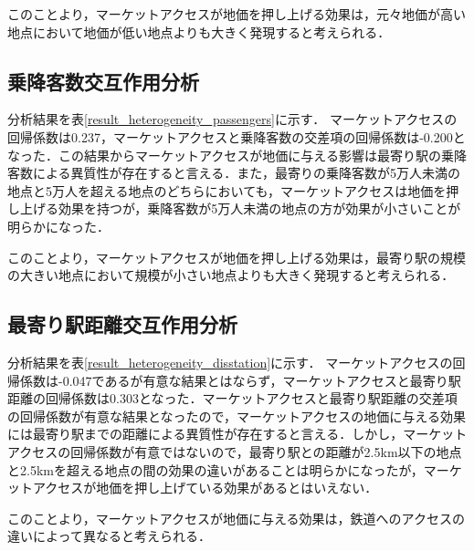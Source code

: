 このことより，マーケットアクセスが地価を押し上げる効果は，元々地価が高い地点において地価が低い地点よりも大きく発現すると考えられる．


\subsection{乗降客数交互作用分析}
分析結果を表\ref{result_heterogeneity_passengers}に示す．
マーケットアクセスの回帰係数は0.237，マーケットアクセスと乗降客数の交差項の回帰係数は-0.200となった．この結果からマーケットアクセスが地価に与える影響は最寄り駅の乗降客数による異質性が存在すると言える．また，最寄りの乗降客数が5万人未満の地点と5万人を超える地点のどちらにおいても，マーケットアクセスは地価を押し上げる効果を持つが，乗降客数が5万人未満の地点の方が効果が小さいことが明らかになった．

このことより，マーケットアクセスが地価を押し上げる効果は，最寄り駅の規模の大きい地点において規模が小さい地点よりも大きく発現すると考えられる．

\subsection{最寄り駅距離交互作用分析}
分析結果を表\ref{result_heterogeneity_disstation}に示す．
マーケットアクセスの回帰係数は-0.047であるが有意な結果とはならず，マーケットアクセスと最寄り駅距離の回帰係数は0.303となった．マーケットアクセスと最寄り駅距離の交差項の回帰係数が有意な結果となったので，マーケットアクセスの地価に与える効果には最寄り駅までの距離による異質性が存在すると言える．しかし，マーケットアクセスの回帰係数が有意ではないので，最寄り駅との距離が2.5km以下の地点と2.5kmを超える地点の間の効果の違いがあることは明らかになったが，マーケットアクセスが地価を押し上げている効果があるとはいえない．

このことより，マーケットアクセスが地価に与える効果は，鉄道へのアクセスの違いによって異なると考えられる．


